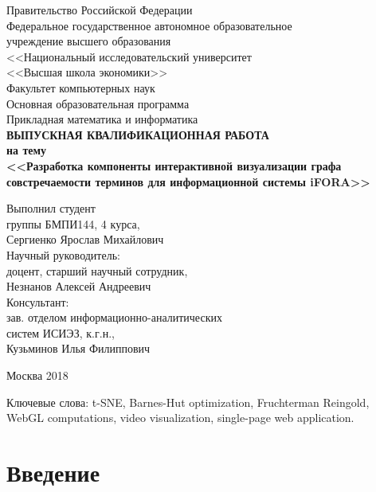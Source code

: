 
\usepackage{setspace}


\thispagestyle{empty}
\begin{center}
  Правительство Российской Федерации\\
  Федеральное государственное автономное образовательное\\
  учреждение высшего образования\\
  <<Национальный исследовательский университет\\
  <<Высшая школа экономики>>\\[1cm]
  Факультет компьютерных наук\\
  Основная образовательная программа\\
  Прикладная математика и информатика\\[2cm]
\bfseries
  {\large ВЫПУСКНАЯ КВАЛИФИКАЦИОННАЯ РАБОТА}\\
  на тему\\
  <<Разработка компоненты интерактивной визуализации графа совстречаемости терминов для информационной системы iFORA>>\\[1cm]
\end{center}
\mdseries
\begin{flushright}
  Выполнил студент\\
  группы БМПИ144, 4 курса,\\
  Сергиенко Ярослав Михайлович\\[1cm]

  Научный руководитель:\\
  доцент, старший научный сотрудник,\\
  Незнанов Алексей Андреевич\\[1cm]

  Консультант:\\
  зав. отделом информационно-аналитических\\
  систем ИСИЭЗ, к.г.н.,\\
  Кузьминов Илья Филиппович \\

\end{flushright}
\vfill
\centerline{Москва 2018}
\newpage

\tableofcontents

\newpage

Ключевые слова: t-SNE, Barnes-Hut optimization, Fruchterman Reingold, WebGL computations, video visualization, single-page web application.

\section*{Введение}
\label{sec:intro}

